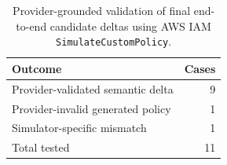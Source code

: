 \begin{table}[t]
\centering
\small
\caption{Provider-grounded validation of final end-to-end candidate deltas using AWS IAM \texttt{SimulateCustomPolicy}.}
\label{tab:provider-native-validation}
\begin{tabular}{lr}
\toprule
Outcome & Cases \\
\midrule
Provider-validated semantic delta & 9 \\
Provider-invalid generated policy & 1 \\
Simulator-specific mismatch & 1 \\
\midrule
Total tested & 11 \\
\bottomrule
\end{tabular}
\end{table}
